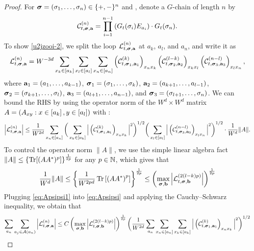 \begin{proof}
For ${\boldsymbol{\sigma}}=(\sigma_1,  \ldots, \sigma_n)\in \{+,-\}^n$ and , denote a $G$-chain of length $n$ by 
\begin{equation}\label{defC=GEG}
    {\mathcal C}^{(n)}_{t, {\boldsymbol{\sigma}}, {\mathbf{a}}} = \prod_{i=1}^{n-1}\left(G_t(\sigma_i) E_{a_i}\right)\cdot  G_t(\sigma_n) .
\end{equation}
To show \eqref{u2jzooi-2}, we split the loop ${\mathcal L}^{(n)}_{t, {\boldsymbol{\sigma}}, {\mathbf{a}}}$ at $a_k$, $a_l$, and $a_n$, and write it as 
$${\mathcal L}^{(n)}_{t, {\boldsymbol{\sigma}}, {\mathbf{a}}} = W^{-3d}\sum_{x_k\in\left[{a_k}\right] }\sum_{x_l\in\left[{a_l}\right]} \sum_{x_n\in \left[{a_n}\right]} \left({{\mathcal C}^{(k)}_{t, {\boldsymbol{\sigma}}_1, {\mathbf{a}}_1}}\right)_{x_n x_k}\left({{\mathcal C}^{(l-k)}_{t, {\boldsymbol{\sigma}}_2, {\mathbf{a}}_2}}\right)_{x_kx_l}\left({{\mathcal C}^{(n-l)}_{t, {\boldsymbol{\sigma}}_3, {\mathbf{a}}_3}}\right)_{x_lx_n} ,$$
where ${\mathbf{a}}_1=(a_1,\ldots,a_{k-1})$, ${\boldsymbol{\sigma}}_1=(\sigma_1,\ldots,\sigma_k)$, ${\mathbf{a}}_2=(a_{k+1},\ldots,a_{l-1})$, ${\boldsymbol{\sigma}}_2=(\sigma_{k+1},\ldots,\sigma_l)$, ${\mathbf{a}}_3=(a_{l+1},\ldots,a_{n-1})$, and ${\boldsymbol{\sigma}}_3=(\sigma_{l+1},\ldots,\sigma_n)$. We can bound the RHS by using the operator norm of the $W^d\times W^d$ matrix $A=(A_{xy}:x\in  \left[{a_k}\right], y\in \left[{a_l}\right])$ with :
\begin{align}
    \left|{\mathcal L}^{(n)}_{t, {\boldsymbol{\sigma}}, {\mathbf{a}}}\right|\le 
\frac{1}{W^{2d}}\sum_{x_n\in \left[{a_n}\right]}
\bigg(\sum_{x_k\in \left[{a_k}\right]}\Big|\left({{\mathcal C}^{(k)}_{t, {\boldsymbol{\sigma}}_1, {\mathbf{a}}_1}}\right)_{x_n x_k}\Big|^2\bigg)^{1/2}
\bigg(\sum_{x_l\in \left[{a_l}\right]}\Big|\left({{\mathcal C}^{(n-l)}_{t, {\boldsymbol{\sigma}}_3, {\mathbf{a}}_3}}\right)_{x_l x_n}\Big|^2\bigg)^{1/2} \cdot \frac{1}{W^d}\|A\| .\label{eq:Apsipsi}
\end{align}
To control the operator norm $\|A\|$, we use the simple linear algebra fact 
\(\|A\|\le \left\{\operatorname{Tr}[(AA^*)^p]\right\}^{\frac{1}{2p}} \)
for any $p\in \mathbb{N}$, which gives that  
\begin{align}\label{eq:Apsipsi1}
\frac{1}{W^d}\|A\| \le  \left\{\frac{1}{W^{2pd}}\operatorname{Tr} \left[{\left(AA^*\right)^{p}}\right]\right\}^{\frac1{2p}}
\le \left(\max_{{\boldsymbol{\sigma}},{\mathbf{b}}}   \left|{\mathcal L}^{(2(l-k)p)}_{t, {\boldsymbol{\sigma}} , {\mathbf{b}}}\right|\right)^{\frac1{2p}}
\end{align}
Plugging \eqref{eq:Apsipsi1} into \eqref{eq:Apsipsi} and applying the Cauchy--Schwarz inequality, we obtain that 
\begin{align*}
 \sum_{a_n}\sum_{a_j\in \cal A(a_n)} \left|{\cal L}^{(n)}_{t, \bsig, \ba}\right|&\le C  \left(\max_{\bsig,\bfb}  \left| {\cal L}^{(2(l-k)p)}_{t, \bsig, \bfb}\right|\right)^{\frac1{2p}} \bigg(\frac{1}{W^{2d}}\sum_{a_n}\sum_{x_n\in\br{a_n}}\sum_{x_k\in\br{a_k}}\Big|\p{{\cal C}^{(k)}_{t, \bsig_1, \ba_1}}_{x_n x_k}\Big|^2\bigg)^{1/2} \\

\end{align*}
\end{proof}
